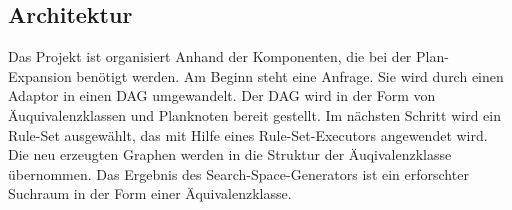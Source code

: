\subsection{Architektur}

Das Projekt ist organisiert Anhand der Komponenten, die bei der Plan-Expansion benötigt werden. Am Beginn steht eine Anfrage. Sie wird durch einen Adaptor in einen DAG umgewandelt. Der DAG wird in der Form von Äuquivalenzklassen und Planknoten bereit gestellt. Im nächsten Schritt wird ein Rule-Set ausgewählt, das mit Hilfe eines Rule-Set-Executors angewendet wird. Die neu erzeugten Graphen werden in die Struktur der Äuqivalenzklasse übernommen. Das Ergebnis des Search-Space-Generators ist ein erforschter Suchraum in der Form einer Äquivalenzklasse.